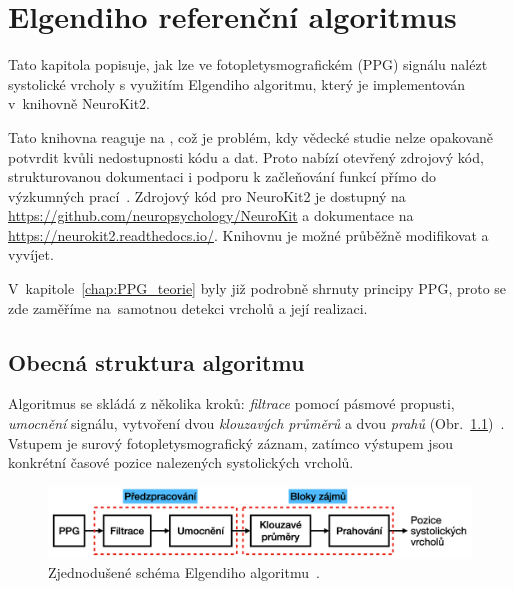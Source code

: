 \chapter{Elgendiho referenční algoritmus}
\label{chap:elgendi_neurokit}
Tato kapitola popisuje, jak lze ve fotopletysmografickém (\acs{PPG}) signálu nalézt systolické vrcholy s využitím Elgendiho algoritmu, který je implementován v~knihovně NeuroKit2.

Tato knihovna reaguje na , což je problém, kdy vědecké studie nelze opakovaně potvrdit kvůli nedostupnosti kódu a dat.
Proto nabízí otevřený zdrojový kód, strukturovanou dokumentaci i podporu k začleňování funkcí přímo do výzkumných prací~\cite{NeuroKit2}.
Zdrojový kód pro NeuroKit2 je dostupný na \url{https://github.com/neuropsychology/NeuroKit} a dokumentace na \url{https://neurokit2.readthedocs.io/}.
Knihovnu je možné průběžně modifikovat a vyvíjet.

V~kapitole~\ref{chap:PPG_teorie} byly již podrobně shrnuty principy \acs{PPG}, proto se zde zaměříme na~samotnou detekci vrcholů a její realizaci.

\section{Obecná struktura algoritmu}
\label{sec:alg_structure}
Algoritmus se skládá z několika kroků: \emph{filtrace} pomocí pásmové propusti, \emph{umocnění} signálu, vytvoření dvou \emph{klouzavých průměrů} a dvou \emph{prahů} (Obr.~\ref{fig:alg-scheme})~\cite{Elgendi2013}.
Vstupem je surový fotopletysmografický záznam, zatímco výstupem jsou konkrétní časové pozice nalezených systolických vrcholů.

\begin{figure}[h]
	\centering
	\includegraphics[width=1\textwidth]{./obrazky/ElgendiBlokSchema.png}
	\vspace{-5mm}
	\caption[Struktura Elgendiho algoritmu]{Zjednodušené schéma Elgendiho algoritmu~\cite{Elgendi2013}.}
	\vspace{-5mm}
	\label{fig:alg-scheme}
\end{figure}

